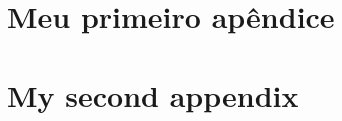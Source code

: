 \documentclass[portuguese,oneside]{pucrs-ppgcc}
\begin{document}
%

%
%



\appendix
\chapter{Meu primeiro apêndice}
\chapter{My second appendix}

\anexos
\end{document}
